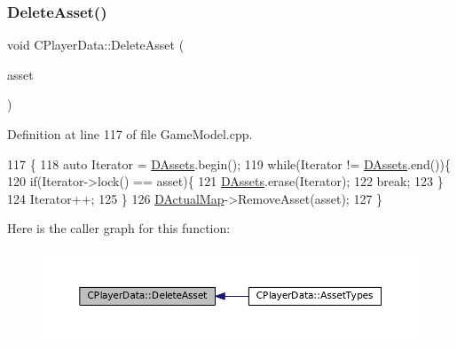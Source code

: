 \subsubsection{\texorpdfstring{Delete\+Asset()}{DeleteAsset()}}
{\footnotesize\ttfamily void C\+Player\+Data\+::\+Delete\+Asset (\begin{DoxyParamCaption}\item[{std\+::shared\+\_\+ptr$<$ \hyperlink{classCPlayerAsset}{C\+Player\+Asset} $>$}]{asset }\end{DoxyParamCaption})}



Definition at line 117 of file Game\+Model.\+cpp.


\begin{DoxyCode}
117                                                                 \{
118     \textcolor{keyword}{auto} Iterator = \hyperlink{classCPlayerData_a1d7dd355facf52db6242e3554373906c}{DAssets}.begin();
119     \textcolor{keywordflow}{while}(Iterator != \hyperlink{classCPlayerData_a1d7dd355facf52db6242e3554373906c}{DAssets}.end())\{
120         \textcolor{keywordflow}{if}(Iterator->lock() == asset)\{
121             \hyperlink{classCPlayerData_a1d7dd355facf52db6242e3554373906c}{DAssets}.erase(Iterator);
122             \textcolor{keywordflow}{break};
123         \}
124         Iterator++;
125     \}
126     \hyperlink{classCPlayerData_a943801106af1d7ad52abd73d32552186}{DActualMap}->RemoveAsset(asset);
127 \}
\end{DoxyCode}
Here is the caller graph for this function\+:\nopagebreak
\begin{figure}[H]
\begin{center}
\leavevmode
\includegraphics[width=350pt]{classCPlayerData_a24f56e033f6d68ceba0f876d854201f0_icgraph}
\end{center}
\end{figure}
\hypertarget{classCPlayerData_ac43ee660aa07b2d9d96eb5285d50fab5}{}\label{classCPlayerData_ac43ee660aa07b2d9d96eb5285d50fab5} 
